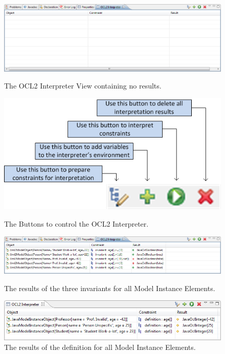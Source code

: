 \begin{figure}[!p]
	\centering
	\includegraphics[width=1.0\linewidth]{figures/interpreter/interpret01}
	\caption{The OCL2 Interpreter View containing no results.}
	\label{pic:interpret:interpret01}

  \vspace{3.0em}
  
	\centering
	\includegraphics[width=0.5\linewidth]{figures/interpreter/interpret02}
	\caption{The Buttons to control the OCL2 Interpreter.}
	\label{pic:interpret:interpret02}

  \vspace{3.0em}

	\centering
	\includegraphics[width=1.0\linewidth]{figures/interpreter/interpret04}
	\caption{The results of the three invariants for all Model Instance Elements.}
	\label{pic:interpret:interpret04}

  \vspace{3.0em}

	\centering
	\includegraphics[width=1.0\linewidth]{figures/interpreter/interpret07}
	\caption{The results of the definition for all Model Instance Elements.}
	\label{pic:interpret:interpret07}

\end{figure}



